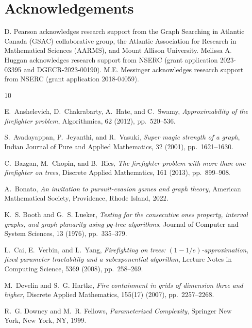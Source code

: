 \documentclass[unknownkeysallowed]{article}
\theoremstyle{definition}\newtheorem{strategy}{Strategy}
\theoremstyle{definition}\newtheorem{notation}{Notation}[theorem]
\begin{document}
\section*{Acknowledgements} 
D. Pearson acknowledges research support from the Graph Searching in Atlantic Canada (GSAC) collaborative group, the Atlantic Association for Research in Mathematical Sciences (AARMS), and Mount Allison University. Melissa A. Huggan acknowledges research support from NSERC (grant application 2023-03395 and DGECR-2023-00190). M.E. Messinger acknowledges research support from NSERC (grant application 2018-04059). 






%
\begin{thebibliography}{10}

{\sc E.~Anshelevich, D.~Chakrabarty, A.~Hate, and C.~Swamy}, {\em Approximability of the firefighter problem}, Algorithmica, 62 (2012), pp.~520--536.

{\sc S.~Avadayappan, P.~Jeyanthi, and R.~Vasuki}, {\em Super magic strength of a graph}, Indian Journal of Pure and Applied Mathematics, 32 (2001), pp.~1621--1630.

{\sc C.~Bazgan, M.~Chopin, and B.~Ries}, {\em The firefighter problem with more than one firefighter on trees}, Discrete Applied Mathematics, 161 (2013), pp.~899--908.

{\sc A.~Bonato}, {\em An invitation to pursuit-evasion games and graph theory}, American Mathematical Society, Providence, Rhode Island, 2022.

{\sc K.~S. Booth and G.~S. Lueker}, {\em Testing for the consecutive ones property, interval graphs, and graph planarity using pq-tree algorithms}, Journal of Computer and System Sciences, 13 (1976), pp.~335--379.

{\sc L.~Cai, E.~Verbin, and L.~Yang}, {\em Firefighting on trees: $(1-1/e)$-approximation, fixed parameter tractability and a subexponential algorithm}, Lecture Notes in Computing Science, 5369 (2008), pp.~258--269.

{\sc M.~Develin and S.~G. Hartke}, {\em Fire containment in grids of dimension three and higher}, Discrete Applied Mathematics, 155(17) (2007), pp.~2257--2268.

{\sc R.~G. Downey and M.~R. Fellows}, {\em Parameterized Complexity}, Springer New York, New York, NY, 1999.


\end{thebibliography}
\end{document}
